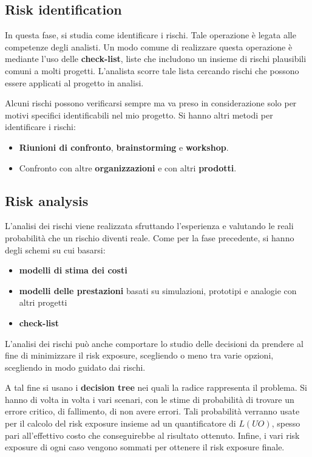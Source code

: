 \subsection{Risk identification}
In questa fase, si studia come identificare i rischi. Tale operazione è legata
alle competenze degli analisti. Un modo comune di realizzare questa operazione è
mediante l'uso delle \textbf{check-list}, liste che includono un insieme di rischi
plausibili comuni a molti progetti. L'analista scorre tale lista cercando rischi
che possono essere applicati al progetto in analisi.

Alcuni rischi possono verificarsi sempre ma va preso in considerazione solo per
motivi specifici identificabili nel mio progetto. Si hanno altri metodi per
identificare i rischi:
\begin{itemize}
    \item \textbf{Riunioni di confronto}, \textbf{brainstorming} e \textbf{workshop}.
    \item Confronto con altre \textbf{organizzazioni} e con altri \textbf{prodotti}.
\end{itemize}
\subsection{Risk analysis}
L'analisi dei rischi viene realizzata sfruttando l'esperienza e valutando le
reali probabilità che un rischio diventi reale. Come per la fase precedente, si
hanno degli schemi su cui basarsi:
\begin{itemize}
    \item \textbf{modelli di stima dei costi}
    \item \textbf{modelli delle prestazioni} basati su simulazioni, prototipi e analogie con altri progetti
    \item \textbf{check-list}
\end{itemize}

L'analisi dei rischi può anche comportare lo studio delle decisioni da prendere
al fine di minimizzare il risk exposure, scegliendo o meno tra varie opzioni,
scegliendo in modo guidato dai rischi. 

A tal fine si usano i \textbf{decision tree} nei quali la radice rappresenta il problema.
Si hanno di volta in volta i vari scenari, con le stime di probabilità di trovare
un errore critico, di fallimento, di non avere errori. Tali
probabilità verranno usate per il calcolo del risk exposure insieme ad un
quantificatore di $L(UO)$, spesso pari all'effettivo costo che conseguirebbe al
risultato ottenuto. Infine, i vari risk exposure di ogni caso vengono sommati per
ottenere il risk exposure finale. 

